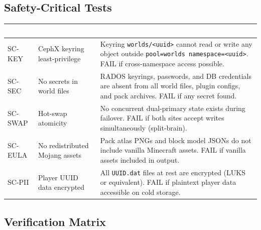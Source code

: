 \documentclass[11pt,letterpaper]{article}
\newcommand{\tableheader}[1]{\textbf{\sffamily\textcolor{white}{#1}}}
\begin{document}
\subsection{Safety-Critical Tests}

\begin{center}
\begin{tabularx}{\textwidth}{L{2cm}L{3.5cm}X}
\toprule
{}
\tableheader{ID} & \tableheader{Verifies} & \tableheader{Expected Outcome / Failure Condition} \\
\midrule
SC-KEY & CephX keyring least-privilege & Keyring \texttt{worlds/<uuid>} cannot read or write any object outside \texttt{pool=worlds namespace=<uuid>}. FAIL if cross-namespace access possible. \\
SC-SEC & No secrets in world files & RADOS keyrings, passwords, and DB credentials are absent from all world files, plugin configs, and pack archives. FAIL if any secret found. \\
SC-SWAP & Hot-swap atomicity & No concurrent dual-primary state exists during failover. FAIL if both sites accept writes simultaneously (split-brain). \\
SC-EULA & No redistributed Mojang assets & Pack atlas PNGs and block model JSONs do not include vanilla Minecraft assets. FAIL if vanilla assets included in output. \\
SC-PII & Player UUID data encrypted & All \texttt{UUID.dat} files at rest are encrypted (LUKS or equivalent). FAIL if plaintext player data accessible on cold storage. \\
\bottomrule
\end{tabularx}
\end{center}

\subsection{Verification Matrix}
\end{document}
